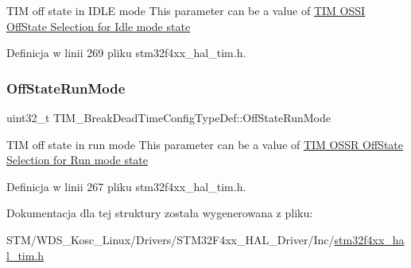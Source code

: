 T\+IM off state in I\+D\+LE mode This parameter can be a value of \hyperlink{group___t_i_m___o_s_s_i___off___state___selection__for___idle__mode__state}{T\+IM O\+S\+SI Off\+State Selection for Idle mode state} 

Definicja w linii 269 pliku stm32f4xx\+\_\+hal\+\_\+tim.\+h.

\mbox{\label{struct_t_i_m___break_dead_time_config_type_def_a5e97751b5e397414e2a5120eb5cef7c6}} 
\subsubsection{\texorpdfstring{Off\+State\+Run\+Mode}{OffStateRunMode}}
{\footnotesize\ttfamily uint32\+\_\+t T\+I\+M\+\_\+\+Break\+Dead\+Time\+Config\+Type\+Def\+::\+Off\+State\+Run\+Mode}

T\+IM off state in run mode This parameter can be a value of \hyperlink{group___t_i_m___o_s_s_r___off___state___selection__for___run__mode__state}{T\+IM O\+S\+SR Off\+State Selection for Run mode state} 

Definicja w linii 267 pliku stm32f4xx\+\_\+hal\+\_\+tim.\+h.



Dokumentacja dla tej struktury została wygenerowana z pliku\+:\begin{DoxyCompactItemize}
\item 
S\+T\+M/\+W\+D\+S\+\_\+\+Kosc\+\_\+\+Linux/\+Drivers/\+S\+T\+M32\+F4xx\+\_\+\+H\+A\+L\+\_\+\+Driver/\+Inc/\hyperlink{stm32f4xx__hal__tim_8h}{stm32f4xx\+\_\+hal\+\_\+tim.\+h}\end{DoxyCompactItemize}
